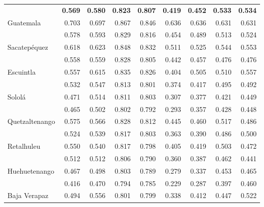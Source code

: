 {\begin{center}
\begin{tabular}{lrrrrrrrr}
			\rowcolor{color1!40!white} {\Bold{República}}&	\textbf{0.569}	&	\textbf{0.580}	&	\textbf{0.823}	&	\textbf{0.807}	&	\textbf{0.419}	&	\textbf{0.452}	&	\textbf{0.533}	&	\textbf{0.534}	\\
			\multicolumn{1}{l}{Guatemala}&	0.703	&	0.697	&	0.867	&	0.846	&	0.636	&	0.636	&	0.631	&	0.631	\\
			\rowcolor{color1!10!white} \multicolumn{1}{l}{El Progreso}&	0.578	&	0.593	&	0.829	&	0.816	&	0.454	&	0.489	&	0.513	&	0.524	\\
			\multicolumn{1}{l}{Sacatepéquez}&	0.618	&	0.623	&	0.848	&	0.832	&	0.511	&	0.525	&	0.544	&	0.553	\\
			\rowcolor{color1!10!white} \multicolumn{1}{l}{Chimaltenango}&	0.558	&	0.559	&	0.828	&	0.805	&	0.442	&	0.457	&	0.476	&	0.476	\\
			\multicolumn{1}{l}{Escuintla}&	0.557	&	0.615	&	0.835	&	0.826	&	0.404	&	0.505	&	0.510	&	0.557	\\
			\rowcolor{color1!10!white} \multicolumn{1}{l}{Santa Rosa}&	0.532	&	0.547	&	0.813	&	0.801	&	0.374	&	0.417	&	0.495	&	0.492	\\
			\multicolumn{1}{l}{Sololá}&	0.471	&	0.514	&	0.811	&	0.803	&	0.307	&	0.377	&	0.421	&	0.449	\\
			\rowcolor{color1!10!white} \multicolumn{1}{l}{Totonicapán}&	0.465	&	0.502	&	0.802	&	0.792	&	0.293	&	0.357	&	0.428	&	0.448	\\
			\multicolumn{1}{l}{Quetzaltenango}&	0.575	&	0.566	&	0.828	&	0.812	&	0.445	&	0.460	&	0.517	&	0.486	\\
			\rowcolor{color1!10!white} \multicolumn{1}{l}{Suchitepéquez}&	0.524	&	0.539	&	0.817	&	0.803	&	0.363	&	0.390	&	0.486	&	0.500	\\
			\multicolumn{1}{l}{Retalhuleu}&	0.550	&	0.540	&	0.817	&	0.798	&	0.405	&	0.419	&	0.503	&	0.472	\\
			\rowcolor{color1!10!white} \multicolumn{1}{l}{San Marcos}&	0.512	&	0.512	&	0.806	&	0.790	&	0.360	&	0.387	&	0.462	&	0.441	\\
			\multicolumn{1}{l}{Huehuetenango}&	0.467	&	0.498	&	0.803	&	0.789	&	0.279	&	0.337	&	0.453	&	0.465	\\
			\rowcolor{color1!10!white} \multicolumn{1}{l}{Quiché}&	0.416	&	0.470	&	0.794	&	0.785	&	0.229	&	0.287	&	0.397	&	0.460	\\
			\multicolumn{1}{l}{Baja Verapaz}&	0.494	&	0.556	&	0.801	&	0.799	&	0.338	&	0.412	&	0.447	&	0.522	\\

\end{tabular}
\end{center}}
